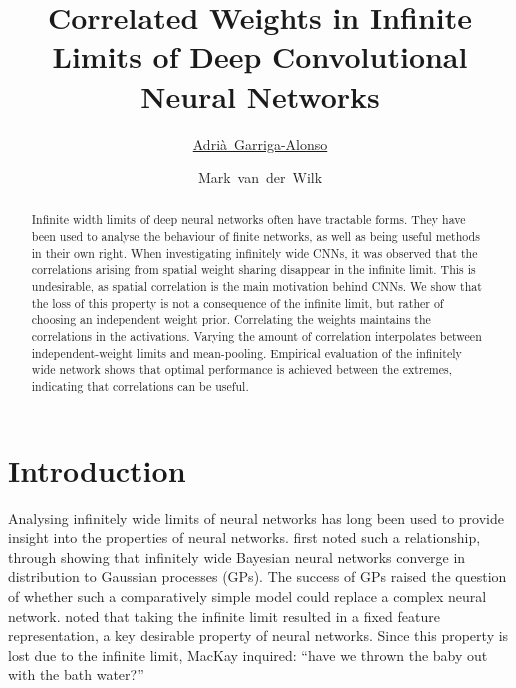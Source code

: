 \documentclass[accepted]{uai2021} %
\title{Correlated Weights in Infinite Limits of Deep Convolutional Neural Networks}
\author[1]{\href{mailto:Adrià Garriga-Alonso <ag919@cam.ac.uk>?Subject=Your UAI 2021 paper}{Adrià~Garriga-Alonso}{}}
\author[2]{Mark~van~der~Wilk}
\affil[1]{%
    Department of Engineering\\
    University of Cambridge\\
    UK
}
\affil[2]{%
    Department of Computer Science\\
    Imperial College London\\
    UK
}
\newcommand{\0}{\boldsymbol{0}}
\newcommand{\1}{\boldsymbol{1}}
\begin{document}
\maketitle

\begin{abstract}
Infinite width limits of deep neural networks often have tractable forms. They have been used to analyse the behaviour of finite networks, as well as being useful methods in their own right. When investigating infinitely wide CNNs, it was observed that the correlations arising from spatial weight sharing disappear in the infinite limit.
This is undesirable, as spatial correlation is the main motivation behind CNNs. We show that the loss of this property is not a consequence of the infinite limit, but rather of choosing an independent weight prior. Correlating the weights maintains the correlations in the activations. 
Varying the amount of correlation interpolates between independent-weight limits and mean-pooling. Empirical evaluation of the infinitely wide network shows that optimal performance is achieved between the extremes, indicating that correlations can be useful.
\end{abstract}

\section{Introduction}
Analysing infinitely wide limits of neural networks has long been used to provide insight into the properties of neural networks.
\citet{neal1996bayesian} first noted such a relationship, through showing that infinitely wide Bayesian neural networks converge in distribution to Gaussian processes (GPs).
The success of GPs raised the question of whether such a comparatively simple model could replace a complex neural network. \citet{mackay1998introgp} noted that taking the infinite limit resulted in a fixed feature representation, a key desirable property of neural networks. Since this property is lost due to the infinite limit, MacKay inquired: ``have we thrown the baby out with the bath water?''
\end{document}
